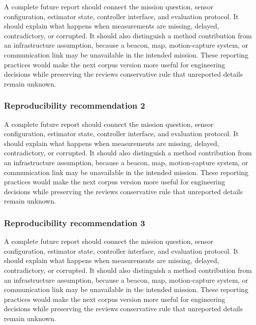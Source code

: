 \documentclass[
  journal,
  10pt]{IEEEtran}
\begin{document}
A complete future report should connect the mission question, sensor
configuration, estimator state, controller interface, and evaluation
protocol. It should explain what happens when measurements are missing,
delayed, contradictory, or corrupted. It should also distinguish a
method contribution from an infrastructure assumption, because a beacon,
map, motion-capture system, or communication link may be unavailable in
the intended mission. These reporting practices would make the next
corpus version more useful for engineering decisions while preserving
the review\textquotesingle s conservative rule that unreported details
remain unknown.

\subsubsection{Reproducibility recommendation
2}\label{reproducibility-recommendation-2}

A complete future report should connect the mission question, sensor
configuration, estimator state, controller interface, and evaluation
protocol. It should explain what happens when measurements are missing,
delayed, contradictory, or corrupted. It should also distinguish a
method contribution from an infrastructure assumption, because a beacon,
map, motion-capture system, or communication link may be unavailable in
the intended mission. These reporting practices would make the next
corpus version more useful for engineering decisions while preserving
the review\textquotesingle s conservative rule that unreported details
remain unknown.

\subsubsection{Reproducibility recommendation
3}\label{reproducibility-recommendation-3}

A complete future report should connect the mission question, sensor
configuration, estimator state, controller interface, and evaluation
protocol. It should explain what happens when measurements are missing,
delayed, contradictory, or corrupted. It should also distinguish a
method contribution from an infrastructure assumption, because a beacon,
map, motion-capture system, or communication link may be unavailable in
the intended mission. These reporting practices would make the next
corpus version more useful for engineering decisions while preserving
the review\textquotesingle s conservative rule that unreported details
remain unknown.
\end{document}
